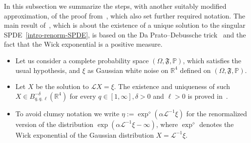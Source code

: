\documentclass{article}
\newcommand{\assign}{:=}
\newenvironment{itemizedot}{\begin{itemize} \renewcommand{\labelitemi}{$\bullet$}\renewcommand{\labelitemii}{$\bullet$}\renewcommand{\labelitemiii}{$\bullet$}\renewcommand{\labelitemiv}{$\bullet$}}{\end{itemize}}
\begin{document}
In this subsection we summarize the steps, with another suitably modified
approximation, of the proof from~{\cite{AVG2021}}, which also set further
required notation. The main result of~{\cite{AVG2021}}, which is about the
existence of a unique solution to the singular SPDE~\eqref{intro-renorm-SPDE},
is based on the Da Prato--Debussche
trick~{\cite{dapratoStrongSolutionsStochastic2003}} and the fact that the Wick
exponential is a positive measure.
\begin{itemizedot}
  \item Let us consider a complete probability space $(\Omega, \mathfrak{F},
  \mathbb{P})$, which satisfies the usual hypothesis, and $\xi$ as Gaussian
  white noise on $\mathbb{R}^4$ defined on $(\Omega, \mathfrak{F},
  \mathbb{P})$.
  
  \item Let $X$ be the solution to $\mathcal{L}X = \xi$. The existence and
  uniqueness of such $X \in B_{q, q, \ell}^{- \delta} (\mathbb{R}^4)$ for
  every $q \in [1, \infty], \delta > 0$ and $\ell > 0$ is proved
  in~{\cite{GH2019}}.
  
  \item To avoid clumsy notation we write $\eta \assign \exp^{\diamond}
  (\alpha \mathcal{L}^{- 1} \xi)$ for the renormalized version of the
  distribution $\exp (\alpha \mathcal{L}^{- 1} \xi - \infty)$, where
  $\exp^{\diamond}$ denotes the Wick exponential of the Gaussian distribution
  $X =\mathcal{L}^{- 1} \xi$.
  

\end{itemizedot}
\end{document}
